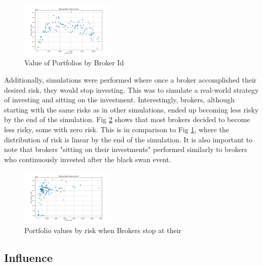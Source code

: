 \documentclass[letterpaper, 11 pt, proceedings]{IEEEtran}
\begin{document}
	\begin{figure}[h]
		\centering
		\includegraphics[width=0.4\textwidth]{valueToRisk.png}
		\caption{Value of Portfolios by Broker Id}
		\label{RV}
	\end{figure}
	\FloatBarrier
	
	Additionally, simulations were performed where once a broker accomplished their desired risk, they would stop investing. This was to simulate a real-world strategy of investing and sitting on the investment. Interestingly, brokers, although starting with the same risks as in other simulations, ended up becoming less risky by the end of the simulation. Fig \ref{stopatstable} shows that most brokers decided to become less risky, some with zero risk. This is in comparison to Fig \ref{RV}, where the distribution of risk is linear by the end of the simulation. It is also important to note that brokers "sitting on their investments" performed similarly to brokers who continuously invested after the black swan event.

	\begin{figure}[h]
		\centering
		\includegraphics[width=0.4\textwidth]{valueToRisk_stopatstable.png}
		\caption{Portfolio values by risk when Brokers stop at their }
		\label{stopatstable}
	\end{figure}
	\FloatBarrier

	
	
	\subsection{Influence}
	
\end{document}

